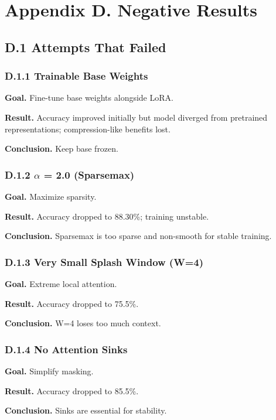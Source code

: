 
\section{Appendix D. Negative Results}

\subsection{D.1 Attempts That Failed}

\subsubsection{D.1.1 Trainable Base Weights}

\textbf{Goal.} Fine-tune base weights alongside LoRA.

\textbf{Result.} Accuracy improved initially but model diverged from pretrained 
representations; compression-like benefits lost.

\textbf{Conclusion.} Keep base frozen.

\subsubsection{D.1.2 $\alpha$ = 2.0 (Sparsemax)}

\textbf{Goal.} Maximize sparsity.

\textbf{Result.} Accuracy dropped to 88.30\%; training unstable.

\textbf{Conclusion.} Sparsemax is too sparse and non-smooth for stable training.

\subsubsection{D.1.3 Very Small Splash Window (W=4)}

\textbf{Goal.} Extreme local attention.

\textbf{Result.} Accuracy dropped to 75.5\%.

\textbf{Conclusion.} W=4 loses too much context.

\subsubsection{D.1.4 No Attention Sinks}

\textbf{Goal.} Simplify masking.

\textbf{Result.} Accuracy dropped to 85.5\%.

\textbf{Conclusion.} Sinks are essential for stability.

